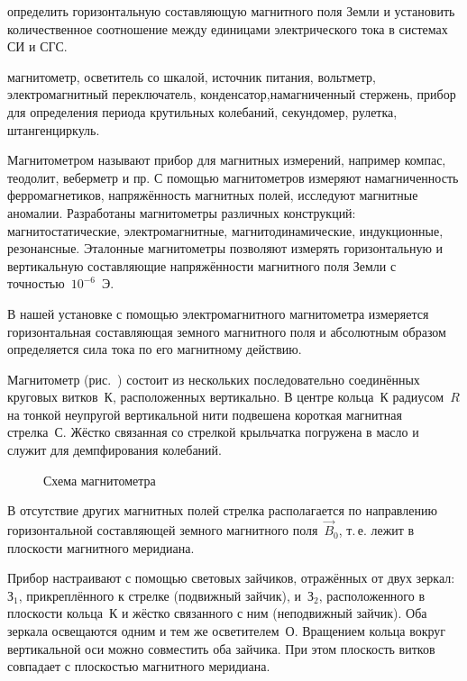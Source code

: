 
\begin{lab:aim}
    определить горизонтальную составляющую магнитного поля Земли и установить
количественное соотношение между единицами электрического тока в системах СИ и
СГС.
\end{lab:aim}

\begin{lab:equipment}
    магнитометр, осветитель со шкалой, источник питания, вольтметр,
электромагнитный переключатель, конденсатор,намагниченный стержень, прибор для
определения периода крутильных колебаний, секундомер, рулетка, штангенциркуль.
\end{lab:equipment}

Магнитометром называют прибор для магнитных измерений, например компас,
теодолит, веберметр и пр. С помощью
магнитометров измеряют намагниченность ферромагнетиков, напряжённость магнитных
полей, исследуют магнитные аномалии.
Разработаны магнитометры различных конструкций: магнитостатические,
электромагнитные, магнитодинамические, индукционные,
резонансные. Эталонные магнитометры позволяют измерять горизонтальную и
вертикальную составляющие напряжённости
магнитного поля Земли с точностью~$10^{-6}$~Э.

В нашей установке с помощью электромагнитного магнитометра измеряется
горизонтальная составляющая земного магнитного
поля и абсолютным образом определяется сила тока по его магнитному действию.

\experiment

Магнитометр (рис.~) состоит из нескольких
последовательно соединённых круговых витков~К, расположенных
вертикально. В центре кольца~К радиусом~$R$
на тонкой неупругой вертикальной нити подвешена
короткая магнитная стрелка~С. Жёстко связанная со стрелкой крыльчатка погружена
в масло и служит для демпфирования колебаний.

\begin{figure}[h!]
    \centering
    \caption{Схема магнитометра}
\end{figure}

В отсутствие других магнитных полей стрелка располагается по направлению
горизонтальной составляющей земного магнитного
поля~$\vec{B}_0$, т.\,е. лежит в плоскости магнитного меридиана.

Прибор настраивают с помощью световых зайчиков, отражённых от двух зеркал:~$З_1$,
прикреплённого к стрелке (подвижный зайчик), и~$З_2$, расположенного в плоскости
кольца~К и жёстко связанного с ним (неподвижный зайчик). Оба зеркала
освещаются одним и тем же осветителем~О. Вращением кольца вокруг вертикальной
оси можно совместить оба зайчика. При этом плоскость витков совпадает
с плоскостью магнитного меридиана.

